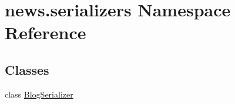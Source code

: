 \hypertarget{namespacenews_1_1serializers}{}\section{news.\+serializers Namespace Reference}
\label{namespacenews_1_1serializers}
\subsection*{Classes}
\begin{DoxyCompactItemize}
\item 
class \mbox{\hyperlink{classnews_1_1serializers_1_1_blog_serializer}{Blog\+Serializer}}
\end{DoxyCompactItemize}
